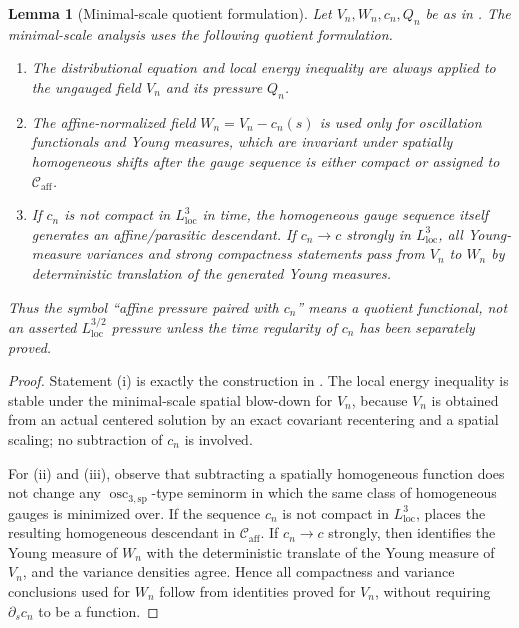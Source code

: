\documentclass[11pt]{amsart}
\numberwithin{equation}{section}
\theoremstyle{plain}
\newtheorem{lemma}[theorem]{Lemma}
\theoremstyle{definition}
\theoremstyle{remark}
\newcommand{\loc}{\mathrm{loc}}
\newcommand{\Caff}{\mathcal C_{\mathrm{aff}}}
\newcommand{\oscsp}{\operatorname{osc}_{3,\mathrm{sp}}}
\begin{document}
\begin{lemma}[Minimal-scale quotient formulation]
\label{lem:first-bad-quotient-formulation}
Let \(V_n,W_n,c_n,Q_n\) be as in
.  The minimal-scale analysis uses the
following quotient formulation.
\begin{enumerate}[label=\textup{(\roman*)}]
   \item The distributional equation and local energy inequality are always
   applied to the ungauged field \(V_n\) and its pressure \(Q_n\).
   \item The affine-normalized field \(W_n=V_n-c_n(s)\) is used only for
   oscillation functionals and Young measures, which are invariant under
   spatially homogeneous shifts after the gauge sequence is either compact or
   assigned to \(\Caff\).
   \item If \(c_n\) is not compact in \(L^3_{\loc}\) in time, the homogeneous
   gauge sequence itself generates an affine/parasitic descendant.  If
   \(c_n\to c\) strongly in \(L^3_{\loc}\), all Young-measure variances and
   strong compactness statements pass from \(V_n\) to \(W_n\) by deterministic
   translation of the generated Young measures.
\end{enumerate}
Thus the symbol ``affine pressure paired with \(c_n\)'' means a quotient
functional, not an asserted \(L^{3/2}_{\loc}\) pressure unless the time
regularity of \(c_n\) has been separately proved.
\end{lemma}

\begin{proof}
Statement (i) is exactly the construction in
.  The local energy inequality is stable
under the minimal-scale spatial blow-down for \(V_n\), because \(V_n\) is obtained
from an actual centered solution by an exact covariant recentering and a spatial
scaling; no subtraction of \(c_n\) is involved.

For (ii) and (iii), observe that subtracting a spatially homogeneous function
does not change any \(\oscsp\)-type seminorm in which the same class of
homogeneous gauges is minimized over.  If the sequence \(c_n\) is not
compact in \(L^3_{\loc}\),  places the
resulting homogeneous descendant in \(\Caff\).  If \(c_n\to c\) strongly, then
 identifies the Young measure of \(W_n\)
with the deterministic translate of the Young measure of \(V_n\), and the
variance densities agree.  Hence all compactness and variance conclusions used
for \(W_n\) follow from identities proved for \(V_n\), without requiring
\(\partial_s c_n\) to be a function.
\end{proof}
\end{document}
